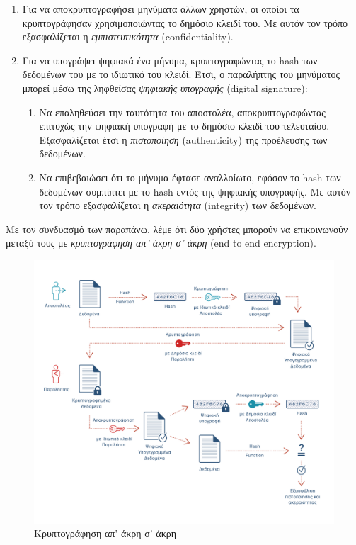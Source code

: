 \begin{enumerate}
	\item Για να αποκρυπτογραφήσει μηνύματα άλλων χρηστών, οι οποίοι τα κρυπτογράφησαν χρησιμοποιώντας το δημόσιο κλειδί του. Με αυτόν τον τρόπο εξασφαλίζεται η \textit{εμπιστευτικότητα} (confidentiality).
	\item Για να υπογράψει ψηφιακά ένα μήνυμα, κρυπτογραφώντας το hash των δεδομένων του με το ιδιωτικό του κλειδί. Έτσι, ο παραλήπτης του μηνύματος μπορεί μέσω της ληφθείσας \textit{ψηφιακής υπογραφής} (digital signature):
	\begin{enumerate}
		\item Να επαληθεύσει την ταυτότητα του αποστολέα, αποκρυπτογραφώντας επιτυχώς την ψηφιακή υπογραφή με το δημόσιο κλειδί του τελευταίου. Εξασφαλίζεται έτσι η \textit{πιστοποίηση} (authenticity) της προέλευσης των δεδομένων.
		\item Να επιβεβαιώσει ότι το μήνυμα έφτασε αναλλοίωτο, εφόσον το hash των δεδομένων συμπίπτει με το hash εντός της ψηφιακής υπογραφής. Με αυτόν τον τρόπο εξασφαλίζεται η \textit{ακεραιότητα} (integrity) των δεδομένων.
	\end{enumerate}
\end{enumerate}

Με τον συνδυασμό των παραπάνω, λέμε ότι δύο χρήστες μπορούν να επικοινωνούν μεταξύ τους με \textit{κρυπτογράφηση απ' άκρη σ' άκρη} (end to end encryption).

\begin{figure}[H]
	\centering
	\includegraphics[width=15cm]{assets/figures/asymmetric-end-to-end-communication.png}
	\caption{Κρυπτογράφηση απ' άκρη σ' άκρη}
\end{figure}

